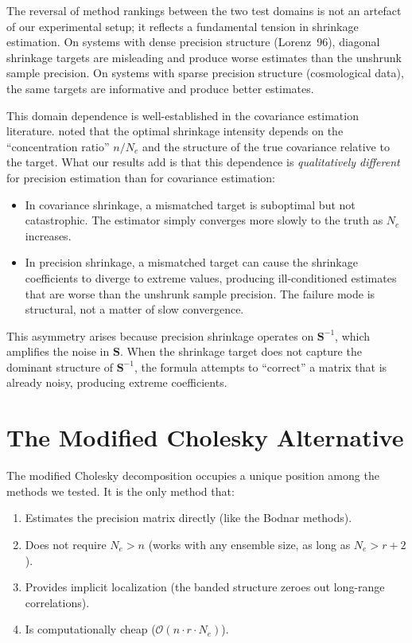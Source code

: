 The reversal of method rankings between the two test domains is not an artefact of our experimental setup; it reflects a fundamental tension in shrinkage estimation. On systems with dense precision structure (Lorenz~96), diagonal shrinkage targets are misleading and produce worse estimates than the unshrunk sample precision. On systems with sparse precision structure (cosmological data), the same targets are informative and produce better estimates.

This domain dependence is well-established in the covariance estimation literature. \citet{ledoit2004well} noted that the optimal shrinkage intensity depends on the ``concentration ratio'' $n/N_e$ and the structure of the true covariance relative to the target. What our results add is that this dependence is \emph{qualitatively different} for precision estimation than for covariance estimation:

\begin{itemize}
\item In covariance shrinkage, a mismatched target is suboptimal but not catastrophic. The estimator simply converges more slowly to the truth as $N_e$ increases.
\item In precision shrinkage, a mismatched target can cause the shrinkage coefficients to diverge to extreme values, producing ill-conditioned estimates that are worse than the unshrunk sample precision. The failure mode is structural, not a matter of slow convergence.
\end{itemize}

This asymmetry arises because precision shrinkage operates on $\mathbf{S}^{-1}$, which amplifies the noise in $\mathbf{S}$. When the shrinkage target does not capture the dominant structure of $\mathbf{S}^{-1}$, the formula attempts to ``correct'' a matrix that is already noisy, producing extreme coefficients.

\section{The Modified Cholesky Alternative}
\label{sec:disc_cholesky}

The modified Cholesky decomposition occupies a unique position among the methods we tested. It is the only method that:
\begin{enumerate}
\item Estimates the precision matrix directly (like the Bodnar methods).
\item Does not require $N_e > n$ (works with any ensemble size, as long as $N_e > r + 2$).
\item Provides implicit localization (the banded structure zeroes out long-range correlations).
\item Is computationally cheap ($\mathcal{O}(n \cdot r \cdot N_e)$).
\end{enumerate}

